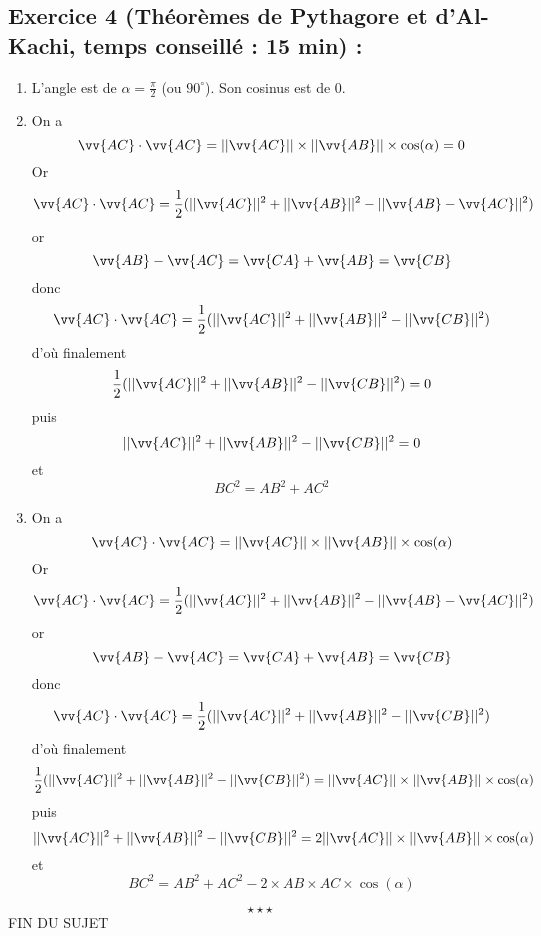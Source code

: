 \subsection*{Exercice 4 (Théorèmes de Pythagore et d'Al-Kachi, temps conseillé : 15 min) : }
\begin{enumerate}
\item L'angle est de $\alpha = \frac{\pi}{2}$ (ou $90^\circ$). Son cosinus est de 0.
\item On a 
$$\vv{AC}\cdot\vv{AC} = ||\vv{AC}|| \times ||\vv{AB}|| \times \cos(\alpha) = 0$$
Or 
$$\vv{AC}\cdot\vv{AC} = \frac{1}{2}(||\vv{AC}||^2 + ||\vv{AB}||^2 - ||\vv{AB}-\vv{AC}||^2)$$
or $$\vv{AB} - \vv{AC} = \vv{CA} + \vv{AB} = \vv{CB}$$ donc
$$\vv{AC}\cdot\vv{AC} = \frac{1}{2}(||\vv{AC}||^2 + ||\vv{AB}||^2 - ||\vv{CB}||^2)$$
d'où finalement 
$$\frac{1}{2}(||\vv{AC}||^2 + ||\vv{AB}||^2 - ||\vv{CB}||^2) =0$$
puis
$$||\vv{AC}||^2 + ||\vv{AB}||^2 - ||\vv{CB}||^2 = 0$$
et 
$$\boxed{BC^2 = AB^2 + AC^2}$$
\item On a
$$\vv{AC}\cdot\vv{AC} = ||\vv{AC}|| \times ||\vv{AB}|| \times \cos(\alpha)$$
Or 
$$\vv{AC}\cdot\vv{AC} = \frac{1}{2}(||\vv{AC}||^2 + ||\vv{AB}||^2 - ||\vv{AB}-\vv{AC}||^2)$$
or $$\vv{AB} - \vv{AC} = \vv{CA} + \vv{AB} = \vv{CB}$$ donc
$$\vv{AC}\cdot\vv{AC} = \frac{1}{2}(||\vv{AC}||^2 + ||\vv{AB}||^2 - ||\vv{CB}||^2)$$
d'où finalement 
$$\frac{1}{2}(||\vv{AC}||^2 + ||\vv{AB}||^2 - ||\vv{CB}||^2) = ||\vv{AC}|| \times ||\vv{AB}|| \times \cos(\alpha)$$
puis
$$||\vv{AC}||^2 + ||\vv{AB}||^2 - ||\vv{CB}||^2 = 2 ||\vv{AC}|| \times ||\vv{AB}|| \times \cos(\alpha)$$
et 
$$\boxed{BC^2 = AB^2 + AC^2 - 2 \times AB \times AC \times \cos(\alpha)}$$
\end{enumerate}
$$\star \star \star$$
\center
FIN DU SUJET

